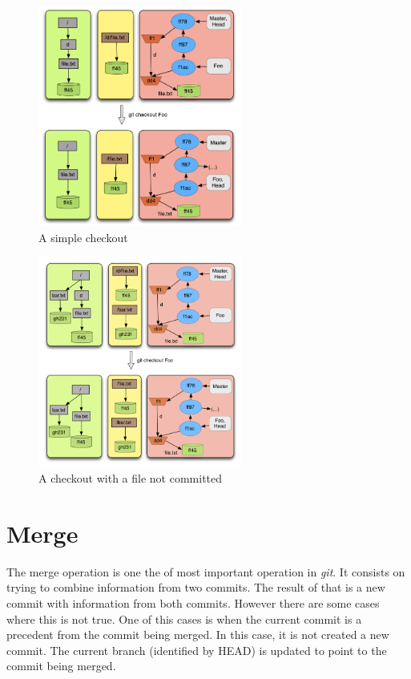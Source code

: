 \begin{figure}[!t]
   \centering
   \includegraphics[width=0.6\textwidth]{images/checkout.png}
   \caption{A simple checkout}\label{fig:checkout}
\end{figure}
\begin{figure}[!t]
   \centering
   \includegraphics[width=0.6\textwidth]{images/notsosimplecheckout.png}
   \caption{A checkout with a file not committed}\label{fig:checkout2}
\end{figure}

\section{Merge}

The merge operation is one the of most important operation in \emph{git}. It
consists on trying to combine information from two commits. The result of that
is a new commit with information from both commits. However there are some cases
where this is not true. One of this cases is when the current commit
is a precedent from the commit being merged. In this case, it is not
created a new commit. The current branch (identified by HEAD) is
updated to point to the commit being merged.\\

